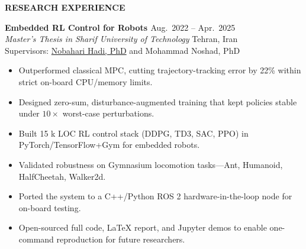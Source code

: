 \documentclass[12pt]{article}
\begin{document}
\vspace{0.2in} %


 \newpage
\begin{center}
	{\noindent \bfseries RESEARCH EXPERIENCE}
\end{center}

\vspace{8pt} %

\noindent

\noindent %
{\bfseries  Embedded RL Control for Robots
\href{https://github.com/CNAVLAB}{\faGithub}
} \hfill Aug.\ 2022 -- Apr.\ 2025 \\[2pt]
\noindent \textit{Master's Thesis in Sharif University of Technology} \hfill Tehran, Iran \\[2pt]
\noindent Supervisors:
\href{https://ae.sharif.edu/~portal/faculty/1091235256}{Nobahari Hadi, PhD} 
{
	and
Mohammad Noshad, PhD
 }{}
\vspace{-4pt}
\begin{itemize}   \itemsep 1pt %
	\item Outperformed classical MPC, cutting trajectory-tracking error by 22\% within strict on-board CPU/memory limits.
	\item Designed zero-sum, disturbance-augmented training that kept policies stable under $10\times$ worst-case perturbations.
	\item Built 15 k LOC RL control stack (DDPG, TD3, SAC, PPO) in PyTorch/TensorFlow+Gym for embedded robots.
    \item Validated robustness on Gymnasium locomotion tasks—Ant, Humanoid, HalfCheetah, Walker2d.%
    \item Ported the system to a C++/Python ROS 2 hardware-in-the-loop node for on-board testing.%
    \item Open-sourced full code, LaTeX report, and Jupyter demos to enable one-command reproduction for future researchers.
\end{itemize}
\end{document}
